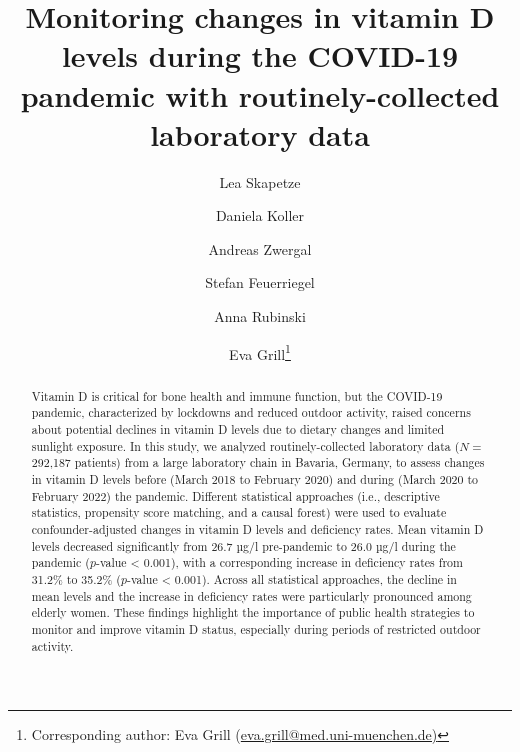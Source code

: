 \documentclass[12pt]{article}
\begin{document}

\title{\centering\LARGE\singlespacing Monitoring changes in vitamin D levels during the COVID-19 pandemic with routinely-collected laboratory data}


\renewcommand\Affilfont{\fontsize{9}{10.8}\selectfont}

\author[1,2]{Lea Skapetze}
\author[1]{Daniela Koller}
\author[3,4]{Andreas Zwergal}
\author[5,6]{Stefan Feuerriegel}
\author[2,$\dagger$]{Anna Rubinski}
\author[,1,4,$\dagger$]{Eva Grill\thanks{Corresponding author: Eva Grill (\href{mailto:Eva.Grill@med.uni-muenchen.de}{eva.grill@med.uni-muenchen.de)}}}





\date{}

\maketitle

\newpage
\linenumbers

\begin{abstract}
Vitamin D is critical for bone health and immune function, but the COVID-19 pandemic, characterized by lockdowns and reduced outdoor activity, raised concerns about potential declines in vitamin D levels due to dietary changes and limited sunlight exposure. In this study, we analyzed routinely-collected laboratory data ($N=$ 292,187 patients) from a large laboratory chain in Bavaria, Germany, to assess changes in vitamin D levels before (March 2018 to February 2020) and during (March 2020 to February 2022) the pandemic. Different statistical approaches (i.e., descriptive statistics, propensity score matching, and a causal forest) were used to evaluate confounder-adjusted changes in vitamin D levels and deficiency rates. Mean vitamin D levels decreased significantly from 26.7 µg/l pre-pandemic to 26.0 µg/l during the pandemic ($p$-value < 0.001), with a corresponding increase in deficiency rates from 31.2\% to 35.2\% ($p$-value < 0.001). Across all statistical approaches, the decline in mean levels and the increase in deficiency rates were particularly pronounced among elderly women. These findings highlight the importance of public health strategies to monitor and improve vitamin D status, especially during periods of restricted outdoor activity.
\end{abstract}
\end{document}
